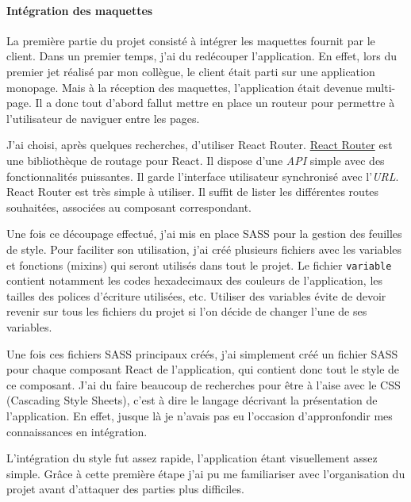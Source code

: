 \paragraph{Intégration des
maquettes}\label{intuxe9gration-des-maquettes}

\bigskip

La première partie du projet consisté à intégrer les maquettes fournit
par le client. Dans un premier temps, j'ai du redécouper l'application.
En effet, lors du premier jet réalisé par mon collègue, le client était
parti sur une application monopage. Mais à la réception des maquettes,
l'application était devenue multi-page. Il a donc tout d'abord fallut
mettre en place un routeur pour permettre à l'utilisateur de naviguer
entre les pages.

\bigskip

J'ai choisi, après quelques recherches, d'utiliser React Router.
\href{https://github.com/ReactTraining/react-router}{React Router} est
une bibliothèque de routage pour React. Il dispose d'une \emph{API}
simple avec des fonctionnalités puissantes. Il garde l'interface
utilisateur synchronisé avec l'\emph{URL}. React Router est très simple
à utiliser. Il suffit de lister les différentes routes souhaitées,
associées au composant correspondant.

\bigskip

Une fois ce découpage effectué, j'ai mis en place SASS pour la gestion
des feuilles de style. Pour faciliter son utilisation, j'ai créé
plusieurs fichiers avec les variables et fonctions (mixins) qui seront
utilisés dans tout le projet. Le fichier \texttt{variable} contient
notamment les codes hexadecimaux des couleurs de l'application, les
tailles des polices d'écriture utilisées, etc. Utiliser des variables
évite de devoir revenir sur tous les fichiers du projet si l'on décide
de changer l'une de ses variables.

\bigskip

Une fois ces fichiers SASS principaux créés, j'ai simplement créé un
fichier SASS pour chaque composant React de l'application, qui contient
donc tout le style de ce composant. J'ai du faire beaucoup de recherches
pour être à l'aise avec le CSS (Cascading Style Sheets), c'est à dire le
langage décrivant la présentation de l'application. En effet, jusque là
je n'avais pas eu l'occasion d'appronfondir mes connaissances en
intégration.

\bigskip

L'intégration du style fut assez rapide, l'application étant
visuellement assez simple. Grâce à cette première étape j'ai pu me
familiariser avec l'organisation du projet avant d'attaquer des parties
plus difficiles.


